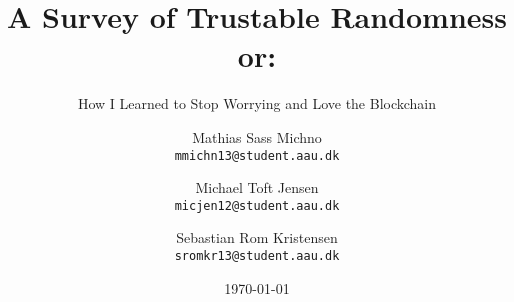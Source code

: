 \newcommand{\TITLE}{A Survey of Trustable Randomness or:}
\newcommand{\SUBTITLE}{How I Learned to Stop Worrying and Love the Blockchain}
\newcommand{\SUBJECT}{Subject subject}
\newcommand{\THEME}{Theme theme}
\newcommand{\GROUP}{deis923e17}
\newcommand{\PERIOD}{Fall semester, 2017}
\newcommand{\MEMBERS}{%
    Name1\\
	Name2\\
	Name3
}
\newcommand{\SUPERVISOR}{Stefan Schmid}
\newcommand{\COMPLETION}{December 22, 2017}

\title{\TITLE}
\subtitle{\SUBTITLE}
\author{
    Mathias Sass Michno\\
    \texttt{mmichn13@student.aau.dk}
    \and
    Michael Toft Jensen\\
    \texttt{micjen12@student.aau.dk}
    \and
    Sebastian Rom Kristensen\\
    \texttt{sromkr13@student.aau.dk}
}
\date{\today}
